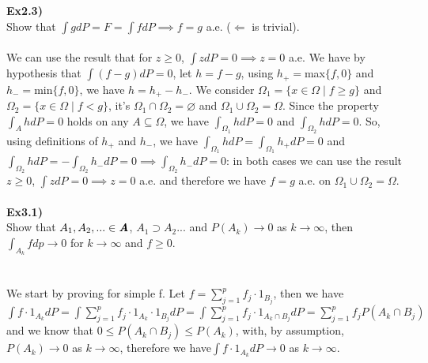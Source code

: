 \documentclass[12pt,mythesisstyle]{report}
\begin{document}
\textbf{Ex2.3)}\\
Show that $\int gdP=F=\int fdP\implies f=g$ a.e. ($\Longleftarrow$ is trivial).
\\\\
We can use the result that for $z\geq 0$, $\int zdP=0 \implies z=0$ a.e. We have by hypothesis that $\int (f-g)dP=0$, let $h=f-g$, using $h_+=$max$\{f,0\}$ and $h_-=$min$\{f,0\}$, we have $h=h_+-h_-$. We consider $\Omega_1=\{x\in\Omega \mid f\geq g\}$ and $\Omega_2=\{x\in\Omega \mid f<g\}$, it's $\Omega_1\cap\Omega_2=\varnothing$ and $\Omega_1\cup\Omega_2=\Omega$. Since the property $\int_A hdP=0$ holds on any $A\subseteq\Omega$, we have $\int_{\Omega_1} hdP=0$ and $\int_{\Omega_2} hdP=0$. So, using definitions of $h_+$ and $h_-$, we have $\int_{\Omega_1} hdP=\int_{\Omega_1} h_+dP=0$ and $\int_{\Omega_2} hdP=-\int_{\Omega_2} h_-dP=0\implies\int_{\Omega_2} h_-dP=0$: in both cases we can use the result $z\geq 0$, $\int zdP=0 \implies z=0$ a.e. and therefore we have $f=g$ a.e. on $\Omega_1\cup\Omega_2=\Omega$.
\\\\
\textbf{Ex3.1)}\\
Show that $A_1, A_2,...\in\textbf{\textit{A}}$, $A_1\supset A_2...$ and $P(A_k)\rightarrow 0$ as $k\rightarrow\infty$, then $\int_{A_k}fdp\rightarrow0$ for $k\rightarrow\infty$ and $f\geq 0$.
\\\\
\\We start by proving for simple f. Let $f=\sum_{j=1}^p f_j\cdot 1_{B_j}$, then we have $\int f\cdot 1_{A_k}dP=\int \sum_{j=1}^p f_j\cdot 1_{A_k}\cdot 1_{B_j}dP=\int \sum_{j=1}^p f_j\cdot 1_{A_k\cap B_j}dP=\sum_{j=1}^p f_jP(A_k\cap B_j)$ and we know that $0\leq P(A_k\cap B_j)\leq P(A_k)$, with, by assumption, $P(A_k)\rightarrow 0$ as $k\rightarrow\infty$, therefore we have$\int f\cdot 1_{A_k}dP\rightarrow 0$ as $k\rightarrow\infty$.
\\
\end{document}
